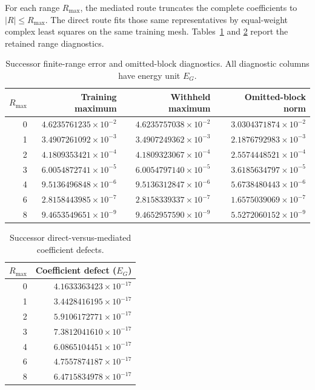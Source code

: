 For each range $R_{\max}$, the mediated route truncates the complete
coefficients to $|R|\leq R_{\max}$. The direct route fits those same
representatives by equal-weight complex least squares on the same training
mesh. Tables~\ref{tab:supp-m1-ranges} and
\ref{tab:supp-m1-route-defects} report the retained range diagnostics.

\begin{table}[ht]
\centering
\small
\caption{Successor finite-range error and omitted-block diagnostics. All diagnostic
columns have energy unit $E_G$.}
\label{tab:supp-m1-ranges}
\begin{tabular}{@{}rrrr@{}}
\toprule
$R_{\max}$ & Training maximum & Withheld maximum & Omitted-block norm \\
\midrule
0 & $4.6235761235\times10^{-2}$ & $4.6235757038\times10^{-2}$ & $3.0304371874\times10^{-2}$ \\
1 & $3.4907261092\times10^{-3}$ & $3.4907249362\times10^{-3}$ & $2.1876792983\times10^{-3}$ \\
2 & $4.1809353421\times10^{-4}$ & $4.1809323067\times10^{-4}$ & $2.5574448521\times10^{-4}$ \\
3 & $6.0054872741\times10^{-5}$ & $6.0054797140\times10^{-5}$ & $3.6185634797\times10^{-5}$ \\
4 & $9.5136496848\times10^{-6}$ & $9.5136312847\times10^{-6}$ & $5.6738480443\times10^{-6}$ \\
6 & $2.8158443985\times10^{-7}$ & $2.8158339337\times10^{-7}$ & $1.6575039069\times10^{-7}$ \\
8 & $9.4653549651\times10^{-9}$ & $9.4652957590\times10^{-9}$ & $5.5272060152\times10^{-9}$ \\
\bottomrule
\end{tabular}
\end{table}

\begin{table}[ht]
\centering
\caption{Successor direct-versus-mediated coefficient defects.}
\label{tab:supp-m1-route-defects}
\begin{tabular}{@{}rr@{}}
\toprule
$R_{\max}$ & Coefficient defect ($E_G$) \\
\midrule
0 & $4.1633363423\times10^{-17}$ \\
1 & $3.4428416195\times10^{-17}$ \\
2 & $5.9106172771\times10^{-17}$ \\
3 & $7.3812041610\times10^{-17}$ \\
4 & $6.0865104451\times10^{-17}$ \\
6 & $4.7557874187\times10^{-17}$ \\
8 & $6.4715834978\times10^{-17}$ \\
\bottomrule
\end{tabular}
\end{table}

